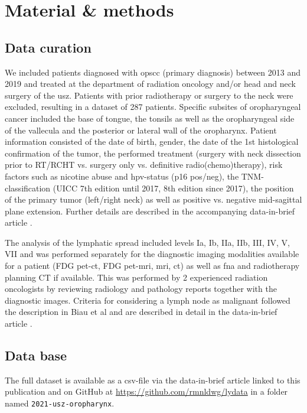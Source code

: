 \documentclass[\relativeRoot/main.tex]{subfiles}
\begin{document}
\section{Material \& methods}
\label{sec:dataset_usz:material}

\subsection*{Data curation}

We included patients diagnosed with \gls{opscc} (primary diagnosis) between 2013 and 2019 and treated at the department of radiation oncology and/or head and neck surgery of the \gls{usz}. Patients with prior radiotherapy or surgery to the neck were excluded, resulting in a dataset of 287 patients. Specific subsites of oropharyngeal cancer included the base of tongue, the tonsils as well as the oropharyngeal side of the vallecula and the posterior or lateral wall of the oropharynx. Patient information consisted of the date of birth, gender, the date of the 1st histological confirmation of the tumor, the performed treatment (surgery with neck dissection prior to RT/RCHT vs. surgery only vs. definitive radio(chemo)therapy), risk factors such as nicotine abuse and \gls{hpv}-status (p16 pos/neg), the TNM-classification (UICC 7th edition until 2017, 8th edition since 2017), the position of the primary tumor (left/right neck) as well as positive vs. negative mid-sagittal plane extension. Further details are described in the accompanying data-in-brief article \cite{ludwig_dataset_2021}.

The analysis of the lymphatic spread included levels Ia, Ib, IIa, IIb, III, IV, V, VII and was performed separately for the diagnostic imaging modalities available for a patient (FDG \gls{pet}-\gls{ct}, FDG \gls{pet}-\gls{mri}, \gls{mri}, \gls{ct}) as well as \gls{fna} and radiotherapy planning CT if available. This was performed by 2 experienced radiation oncologists by reviewing radiology and pathology reports together with the diagnostic images. Criteria for considering a lymph node as malignant followed the description in Biau et al \cite{biau_selection_2019} and are described in detail in the data-in-brief article \cite{ludwig_dataset_2021}.

\subsection*{Data base}

The full dataset is available as a \gls{csv}-file via the data-in-brief article linked to this publication \cite{ludwig_dataset_2021} and on GitHub at \url{https://github.com/rmnldwg/lydata} in a folder named \verb|2021-usz-oropharynx|.
\end{document}
